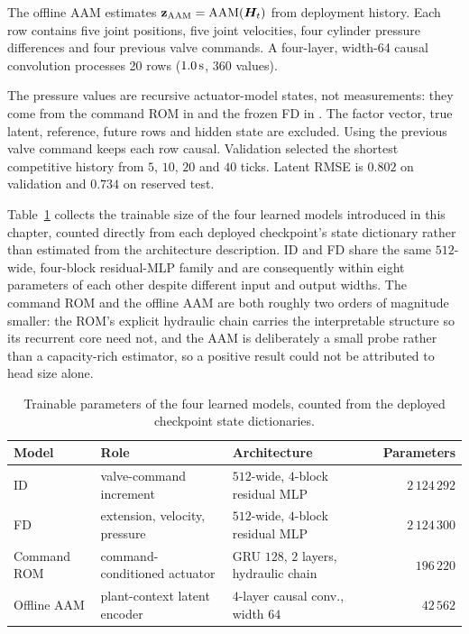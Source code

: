The offline AAM estimates $\mathbf{z}_{\mathrm{AAM}}=\mathrm{AAM}(\bm{H}_t)$ from deployment
history. Each row contains five joint positions, five joint velocities, four
cylinder pressure differences and four previous valve commands. A four-layer,
width-64 causal convolution processes 20 rows ($\unit[1.0]{s}$, 360 values).

The pressure values are recursive actuator-model states, not measurements:
they come from the command ROM in \ppoROM{} and the frozen FD in
\ppoAAMFD{}. The factor vector, true latent, reference, future rows and hidden
state are excluded. Using the previous valve command keeps each row causal.
Validation selected the shortest competitive history from $5$, $10$, $20$ and
$40$ ticks. Latent RMSE is $0.802$ on validation and $0.734$ on reserved test.

Table~\ref{tab:models:param-counts} collects the trainable size of the four
learned models introduced in this chapter, counted directly from each deployed
checkpoint's state dictionary rather than estimated from the architecture
description. ID and FD share the same $512$-wide, four-block residual-MLP
family and are consequently within eight parameters of each other despite
different input and output widths. The command ROM and the offline AAM are
both roughly two orders of magnitude smaller: the ROM's explicit hydraulic
chain carries the interpretable structure so its recurrent core need not, and
the AAM is deliberately a small probe rather than a capacity-rich estimator, so
a positive result could not be attributed to head size alone.

\begin{table}[H]
  \centering
  \caption{Trainable parameters of the four learned models, counted from the
  deployed checkpoint state dictionaries.}
  \label{tab:models:param-counts}
  \footnotesize
  \begin{tabular}{@{}lllr@{}}
    \toprule
    Model & Role & Architecture & Parameters \\
    \midrule
    ID & valve-command increment & $512$-wide, $4$-block residual MLP
      & $2\,124\,292$ \\
    FD & extension, velocity, pressure & $512$-wide, $4$-block residual MLP
      & $2\,124\,300$ \\
    Command ROM & command-conditioned actuator & GRU $128$, $2$ layers,
      hydraulic chain & $196\,220$ \\
    Offline AAM & plant-context latent encoder & $4$-layer causal conv.,
      width $64$ & $42\,562$ \\
    \bottomrule
  \end{tabular}
\end{table}

